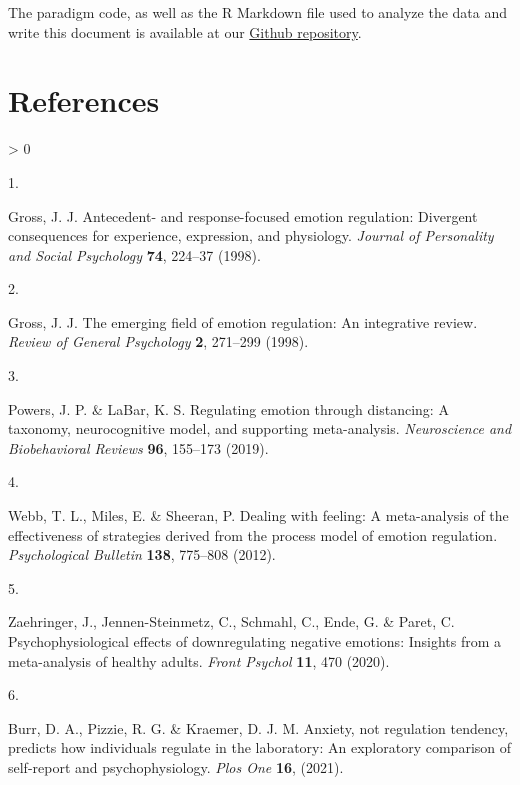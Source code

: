 \documentclass[
  english,
  man,floatsintext]{apa6}
\newlength{\cslhangindent}
\newlength{\csllabelwidth}
\newenvironment{CSLReferences}[2] %
 {%
  \setlength{\parindent}{0pt}
  \ifodd #1 \everypar{\setlength{\hangindent}{\cslhangindent}}\ignorespaces\fi
  \ifnum #2 > 0
  \setlength{\parskip}{#2\baselineskip}
  \fi
 }%
 {}
\newcommand{\CSLLeftMargin}[1]{\parbox[t]{\csllabelwidth}{#1}}
\newcommand{\CSLRightInline}[1]{\parbox[t]{\linewidth - \csllabelwidth}{#1}\break}
\begin{document}
The paradigm code, as well as the R Markdown file used to analyze the data and write this document is available at our \href{https://github.com/ChScheffel/CERED}{Github repository}.

\hypertarget{references}{%
\section{References}\label{references}}

\begingroup
\setlength{\parindent}{-0.5in}
\setlength{\leftskip}{0.5in}

\hypertarget{refs}{}
\begin{CSLReferences}{0}{0}
\leavevmode\hypertarget{ref-Gross1998antecedent}{}%
\CSLLeftMargin{1. }
\CSLRightInline{Gross, J. J. Antecedent- and response-focused emotion regulation: Divergent consequences for experience, expression, and physiology. \emph{Journal of Personality and Social Psychology} \textbf{74}, 224--37 (1998).}

\leavevmode\hypertarget{ref-Gross1998emerging}{}%
\CSLLeftMargin{2. }
\CSLRightInline{Gross, J. J. The emerging field of emotion regulation: An integrative review. \emph{Review of General Psychology} \textbf{2}, 271--299 (1998).}

\leavevmode\hypertarget{ref-Powers2019}{}%
\CSLLeftMargin{3. }
\CSLRightInline{Powers, J. P. \& LaBar, K. S. Regulating emotion through distancing: A taxonomy, neurocognitive model, and supporting meta-analysis. \emph{Neuroscience and Biobehavioral Reviews} \textbf{96}, 155--173 (2019).}

\leavevmode\hypertarget{ref-Webb2012}{}%
\CSLLeftMargin{4. }
\CSLRightInline{Webb, T. L., Miles, E. \& Sheeran, P. Dealing with feeling: A meta-analysis of the effectiveness of strategies derived from the process model of emotion regulation. \emph{Psychological Bulletin} \textbf{138}, 775--808 (2012).}

\leavevmode\hypertarget{ref-Zaehringer2020}{}%
\CSLLeftMargin{5. }
\CSLRightInline{Zaehringer, J., Jennen-Steinmetz, C., Schmahl, C., Ende, G. \& Paret, C. Psychophysiological effects of downregulating negative emotions: Insights from a meta-analysis of healthy adults. \emph{Front Psychol} \textbf{11}, 470 (2020).}

\leavevmode\hypertarget{ref-Burr2021}{}%
\CSLLeftMargin{6. }
\CSLRightInline{Burr, D. A., Pizzie, R. G. \& Kraemer, D. J. M. Anxiety, not regulation tendency, predicts how individuals regulate in the laboratory: An exploratory comparison of self-report and psychophysiology. \emph{Plos One} \textbf{16}, (2021).}


\end{CSLReferences}
\end{document}
